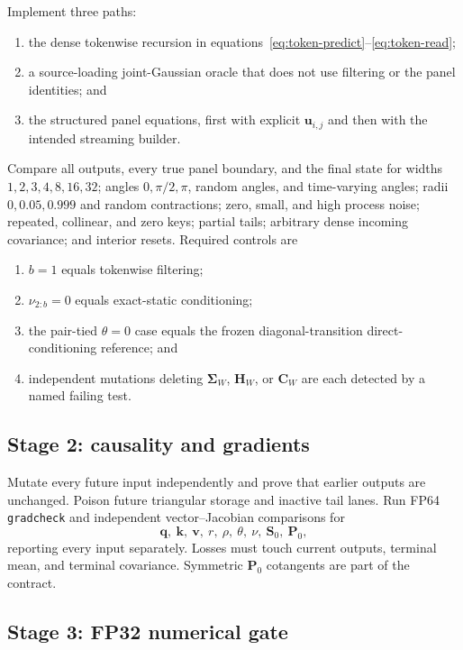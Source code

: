 \documentclass[11pt]{article}
\newcommand{\ve}[1]{\boldsymbol{#1}}
\begin{document}
Implement three paths:
\begin{enumerate}[leftmargin=1.8em,itemsep=2pt]
  \item the dense tokenwise recursion in equations~\eqref{eq:token-predict}--\eqref{eq:token-read};
  \item a source-loading joint-Gaussian oracle that does not use filtering or the panel
        identities; and
  \item the structured panel equations, first with explicit $\ve{u}_{i,j}$ and then with the
        intended streaming builder.
\end{enumerate}
Compare all outputs, every true panel boundary, and the final state for widths
$1,2,3,4,8,16,32$; angles $0,\pi/2,\pi$, random angles, and time-varying angles; radii
$0,0.05,0.999$ and random contractions; zero, small, and high process noise; repeated, collinear,
and zero keys; partial tails; arbitrary dense incoming covariance; and interior resets.  Required
controls are
\begin{enumerate}[leftmargin=1.8em,itemsep=1pt]
  \item $b=1$ equals tokenwise filtering;
  \item $\nu_{2:b}=0$ equals exact-static conditioning;
  \item the pair-tied $\theta=0$ case equals the frozen diagonal-transition direct-conditioning
        reference; and
  \item independent mutations deleting $\ve{\Sigma}_W$, $\ve{H}_W$, or $\ve{C}_W$ are each
        detected by a named failing test.
\end{enumerate}

\subsection{Stage 2: causality and gradients}

Mutate every future input independently and prove that earlier outputs are unchanged.  Poison
future triangular storage and inactive tail lanes.  Run FP64 \texttt{gradcheck} and independent
vector--Jacobian comparisons for
\begin{equation}
  \ve{q},\ \ve{k},\ \ve{v},\ r,\ \rho,\ \theta,\ \nu,
  \ \ve{S}_0,\ \ve{P}_0,
\end{equation}
reporting every input separately.  Losses must touch current outputs, terminal mean, and terminal
covariance.  Symmetric $\ve{P}_0$ cotangents are part of the contract.

\subsection{Stage 3: FP32 numerical gate}
\end{document}
